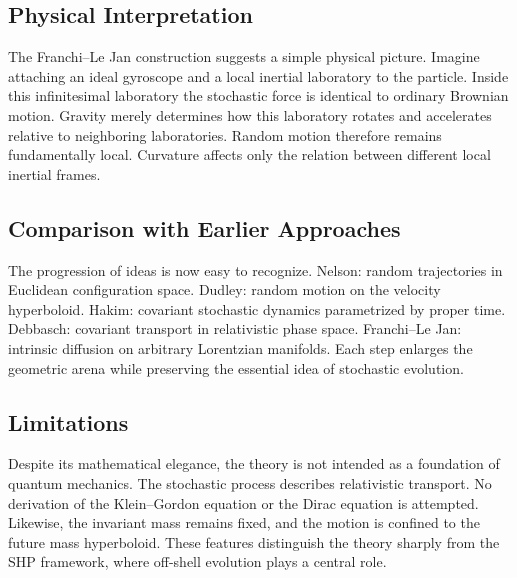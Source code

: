 \subsection{Physical Interpretation}
The Franchi--Le Jan construction suggests a simple physical picture.
Imagine attaching an ideal gyroscope and a local inertial laboratory to
the particle.
Inside this infinitesimal laboratory the stochastic force is identical
to ordinary Brownian motion.
Gravity merely determines how this laboratory rotates and accelerates
relative to neighboring laboratories.
Random motion therefore remains fundamentally local.
Curvature affects only the relation between different local inertial
frames.
\subsection{Comparison with Earlier Approaches}
The progression of ideas is now easy to recognize.
Nelson:
random trajectories in Euclidean configuration space.
Dudley:
random motion on the velocity hyperboloid.
Hakim:
covariant stochastic dynamics parametrized by proper time.
Debbasch:
covariant transport in relativistic phase space.
Franchi--Le Jan:
intrinsic diffusion on arbitrary Lorentzian manifolds.
Each step enlarges the geometric arena while preserving the essential
idea of stochastic evolution.
\subsection{Limitations}
Despite its mathematical elegance, the theory is not intended as a
foundation of quantum mechanics.
The stochastic process describes relativistic transport.
No derivation of the Klein--Gordon equation or the Dirac equation is
attempted.
Likewise,
the invariant mass remains fixed,
and the motion is confined to the future mass hyperboloid.
These features distinguish the theory sharply from the SHP framework,
where off-shell evolution plays a central role.
